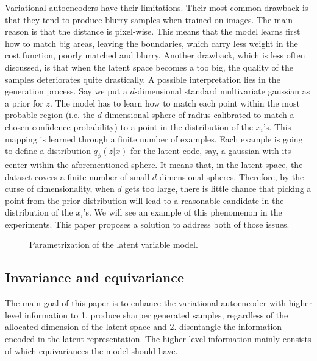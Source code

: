 \documentclass[letterpaper, twoside]{article}
\begin{document}
    Variational autoencoders have their limitations. Their most common drawback is that they tend to produce blurry samples when trained on images. The main reason is that the distance is pixel-wise. This means that the model learns first how to match big areas, leaving the boundaries, which carry less weight in the cost function, poorly matched and blurry. Another drawback, which is less often discussed, is that when the latent space becomes a too big, the quality of the samples deteriorates quite drastically. A possible interpretation lies in the generation process. Say we put a $d$-dimensional standard multivariate gaussian as a prior for $z$. The model has to learn how to match each point within the most probable region (i.e. the $d$-dimensional sphere of radius calibrated to match a chosen confidence probability) to a point in the distribution of the $x_i$'s. This mapping is learned through a finite number of examples. Each example is going to define a distribution $q_\phi(z|x)$ for the latent code, say, a gaussian with its center within the aforementioned sphere. It means that, in the latent space, the dataset covers a finite number of small $d$-dimensional spheres. Therefore, by the curse of dimensionality, when $d$ gets too large, there is little chance that picking a point from the prior distribution will lead to a reasonable candidate in the distribution of the $x_i$'s.
    We will see an example of this phenomenon in the experiments. This paper proposes a solution to address both of those issues.


    \begin{figure}
    \centering
    \caption{Parametrization of the latent variable model.}
    \label{vaegraphmodel}
    \end{figure}

  \subsection{Invariance and equivariance}
        The main goal of this paper is to enhance the variational autoencoder with higher level information to 1. produce sharper generated samples, regardless of the allocated dimension of the latent space and 2. disentangle the information encoded in the latent representation. The higher level information mainly consists of which equivariances the model should have. \\
\end{document}
